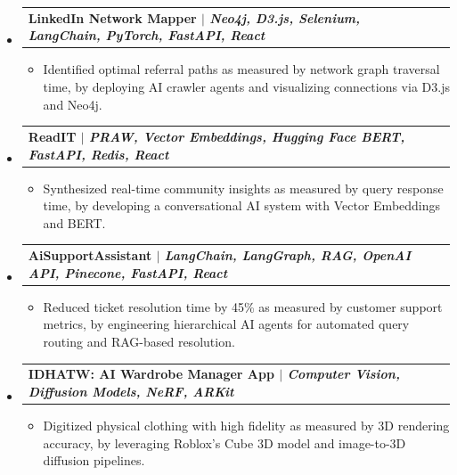 \documentclass[10pt,a4paper]{article}
\makeatletter
\newcommand{\resumeItem}[1]{\item\small{#1}}
\newcommand{\resumeProjectHeading}[2]{
  \vspace{-1pt}\item
    \begin{tabular*}{1.0\textwidth}[t]{l@{\extracolsep{\fill}}r}
      \textbf{#1} & #2 \\
    \end{tabular*}\vspace{-5pt}
}
\makeatother
\begin{document}
\begin{itemize}[leftmargin=0.15in, label={}]
\begin{itemize}[leftmargin=0.15in, label={\textbullet}]
      \end{itemize}
    \resumeProjectHeading
      {\textbf{LinkedIn Network Mapper} $|$ \emph{Neo4j, D3.js, Selenium, LangChain, PyTorch, FastAPI, React}}{}
      \begin{itemize}[leftmargin=0.15in, label={\textbullet}]
        \resumeItem{Identified optimal referral paths as measured by network graph traversal time, by deploying AI crawler agents and visualizing connections via D3.js and Neo4j.}
      \end{itemize}
    \resumeProjectHeading
      {\textbf{ReadIT} $|$ \emph{PRAW, Vector Embeddings, Hugging Face BERT, FastAPI, Redis, React}}{}
      \begin{itemize}[leftmargin=0.15in, label={\textbullet}]
        \resumeItem{Synthesized real-time community insights as measured by query response time, by developing a conversational AI system with Vector Embeddings and BERT.}
      \end{itemize}
    \resumeProjectHeading
      {\textbf{AiSupportAssistant} $|$ \emph{LangChain, LangGraph, RAG, OpenAI API, Pinecone, FastAPI, React}}{}
      \begin{itemize}[leftmargin=0.15in, label={\textbullet}]
        \resumeItem{Reduced ticket resolution time by 45\% as measured by customer support metrics, by engineering hierarchical AI agents for automated query routing and RAG-based resolution.}
      \end{itemize}
    \resumeProjectHeading
      {\textbf{IDHATW: AI Wardrobe Manager App} $|$ \emph{Computer Vision, Diffusion Models, NeRF, ARKit}}{}
      \begin{itemize}[leftmargin=0.15in, label={\textbullet}]
        \resumeItem{Digitized physical clothing with high fidelity as measured by 3D rendering accuracy, by leveraging Roblox's Cube 3D model and image-to-3D diffusion pipelines.}
      \end{itemize}
\end{itemize}
\end{document}
